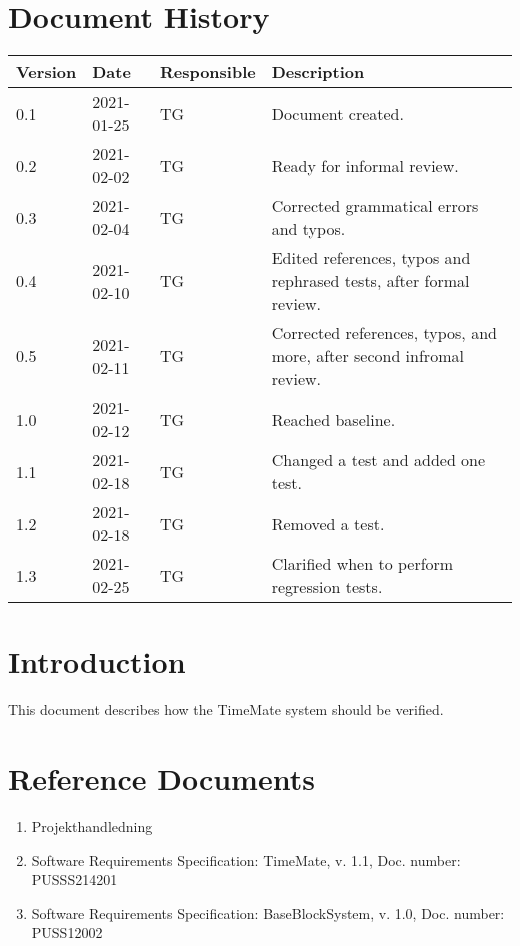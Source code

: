 \documentclass{article}
\date {#1}
\title {
    \documentNumber {02}    
    
    \documentVersion {1.3}
    
    \documentTitle {Software Verification and Validation Specification}
    \documentGroup {2}
    
    \documentResponsible {Test Group}
    \documentAuthors {Test Group}
    
    \documentDate {2021-02-18}
}
\begin{document}
\maketitle
\thispagestyle{empty}

\newpage

\tableofcontents

\newpage



\section{Document History}
\begin{tabular}{ l | l | l | l }
    Version & Date & Responsible & Description \\
    \hline
    0.1 & 2021-01-25 & TG & Document created. \\
    0.2 & 2021-02-02 & TG & Ready for informal review. \\
    0.3 & 2021-02-04 & TG & Corrected grammatical errors and typos. \\
    0.4 & 2021-02-10 & TG & Edited references, typos and rephrased tests, after formal review. \\
    0.5 & 2021-02-11 & TG & Corrected references, typos, and more, after second infromal review. \\
	1.0 & 2021-02-12 & TG & Reached baseline. \\
	1.1 & 2021-02-18 & TG & Changed a test and added one test. \\
	1.2 & 2021-02-18 & TG & Removed a test. \\
	1.3 & 2021-02-25 & TG & Clarified when to perform regression tests. \\
\end{tabular}

\section{Introduction}

	This document describes how the TimeMate system should be verified. 

\section{Reference Documents}

\begin{enumerate}
  \item Projekthandledning 
  \item Software Requirements Specification: TimeMate, v. 1.1, Doc. number: PUSSS214201
  \item Software Requirements Specification: BaseBlockSystem, v. 1.0, Doc. number: PUSS12002

\end{enumerate}
\end{document}
